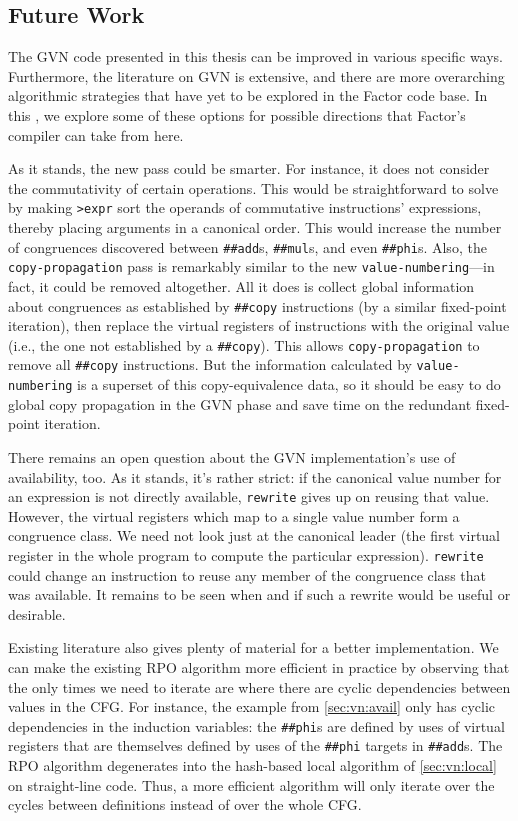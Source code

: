 \subsection{Future Work}\label{sec:vn:future}

The \gls{GVN} code presented in this thesis can be improved in various specific
ways.  Furthermore, the literature on \gls{GVN} is extensive, and there are
more overarching algorithmic strategies that have yet to be explored in the
Factor code base.  In this , we explore some of these
options for possible directions that Factor's compiler can take from here.

As it stands, the new pass could be smarter.  For instance, it does not
consider the commutativity of certain operations.  This would be
straightforward to solve by making \Verb|>expr| sort the operands of
commutative instructions' expressions, thereby placing arguments in a canonical
order.  This would increase the number of congruences discovered between
\Verb|##add|s, \Verb|##mul|s, and even \Verb|##phi|s.  Also, the
\Verb|copy-propagation| pass is remarkably similar to the new
\Verb|value-numbering|---in fact, it could be removed altogether.  All it
does is collect global information about congruences as established by
\Verb|##copy| instructions (by a similar fixed-point iteration), then replace
the virtual registers of instructions with the original value (i.e., the one
not established by a \Verb|##copy|).  This allows \Verb|copy-propagation| to
remove all \Verb|##copy| instructions.  But the information calculated by
\Verb|value-numbering| is a superset of this copy-equivalence data, so it
should be easy to do global copy propagation in the \gls{GVN} phase and save
time on the redundant fixed-point iteration.

There remains an open question about the \gls{GVN} implementation's use of
availability, too.  As it stands, it's rather strict: if the canonical value
number for an expression is not directly available, \Verb|rewrite| gives up
on reusing that value.  However, the virtual registers which map to a single
value number form a congruence class.  We need not look just at the canonical
leader (the first virtual register in the whole program to compute the
particular expression).  \Verb|rewrite| could change an instruction to reuse
any member of the congruence class that was available.  It remains to be seen
when and if such a rewrite would be useful or desirable.

Existing literature also gives plenty of material for a better implementation.
We can make the existing \gls{RPO} algorithm more efficient in practice by
observing that the only times we need to iterate are where there are cyclic
dependencies between values in the \gls{CFG}.  For instance, the example from
\cref{sec:vn:avail} only has cyclic dependencies in the induction variables:
the \Verb|##phi|s are defined by uses of virtual registers that are themselves
defined by uses of the \Verb|##phi| targets in \Verb|##add|s.  The \gls{RPO}
algorithm degenerates into the hash-based local algorithm of
\cref{sec:vn:local} on straight-line code.  Thus, a more efficient algorithm
will only iterate over the cycles between definitions instead of over the whole
\gls{CFG}.  

